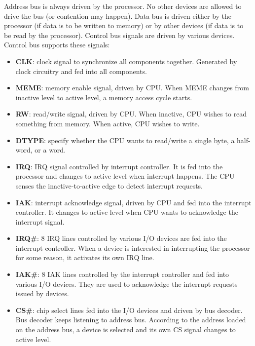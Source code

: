 \documentclass[oneside]{book}
\begin{document}
Address bus is always driven by the processor. No other devices are allowed to
drive the bus (or contention may happen). Data bus is driven either by the
processor (if data is to be written to memory) or by other devices (if
data is to be read by the processor). Control bus signals are driven by
various devices. Control bus supports these signals:

\begin{itemize}

\item \textbf{CLK}: clock signal to synchronize all components together. Generated
by clock circuitry and fed into all components.

\item \textbf{MEME}: memory enable signal, driven by CPU. When MEME changes from
inactive level to active level, a memory access cycle starts.

\item \textbf{RW}: read/write signal, driven by CPU. When inactive, CPU wishes to
read something from memory. When active, CPU wishes to write.

\item \textbf{DTYPE}: specify whether the CPU wants to read/write a single byte,
a half-word, or a word.

\item \textbf{IRQ}: IRQ signal controlled by interrupt controller. It is fed
into the processor and changes to active level when interrupt happens. The CPU
senses the inactive-to-active edge to detect interrupt requests.

\item \textbf{IAK}: interrupt acknowledge signal, driven by CPU and fed into
the interrupt controller. It changes
to active level when CPU wants to acknowledge the interrupt signal.

\item \textbf{IRQ\#}: 8 IRQ lines controlled by various I/O devices are fed into
the interrupt controller. When a device is interested in interrupting the
processor for some reason, it activates its own IRQ line.

\item \textbf{IAK\#}: 8 IAK lines controlled by the interrupt controller and fed
into various I/O devices. They are used to acknowledge the interrupt requests
issued by devices.

\item \textbf{CS\#}: chip select lines fed into the I/O devices and driven by
bus decoder. Bus decoder keeps listening to address bus. According to the
address loaded on the address bus, a device is selected and its own CS signal
changes to active level.

\end{itemize}
\end{document}
